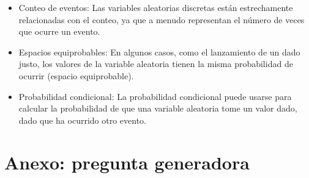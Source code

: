 \documentclass[letterpaper, 12pt]{article}
\begin{document}
	\begin{itemize}
		\item Conteo de eventos: Las variables aleatorias discretas están estrechamente relacionadas con el conteo, ya que a menudo representan el número de veces que ocurre un evento.
		\item Espacios equiprobables: En algunos casos, como el lanzamiento de un dado justo, los valores de la variable aleatoria tienen la misma probabilidad de ocurrir (espacio equiprobable).
		\item Probabilidad condicional: La probabilidad condicional puede usarse para calcular la probabilidad de que una variable aleatoria tome un valor dado, dado que ha ocurrido otro evento.
	\end{itemize}
	
	\section*{Anexo: pregunta generadora}
\end{document}
